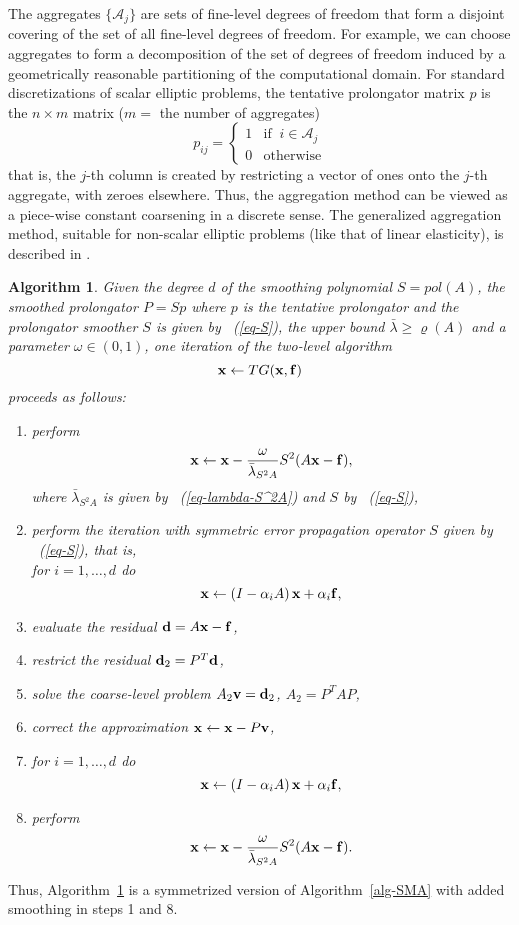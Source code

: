 \documentclass[twoside, 12pt]{article}
\newcommand{\vc}[1]{{\bf #1}} 			%
\newcommand{\eq}[1]{\begin{equation}\label{eq-#1}}
\newcommand{\qe}{\end{equation}}
\newcommand{\eqr}[1]{~(\ref{eq-#1})}        %
\newtheorem{algorithm}{Algorithm}
\begin{document}
The aggregates $\{\mathcal{A}_{j}\}$ are sets of fine-level degrees of freedom
that form a disjoint covering of the set of all fine-level degrees of freedom.
For example, we can choose aggregates to form a decomposition of the set of
degrees of freedom induced by a geometrically reasonable
partitioning of the computational domain.
For standard discretizations of scalar elliptic problems,
the tentative prolongator matrix $p$ is the $n\times m$ matrix
($m=$ the number of aggregates)
\eq{aggr-prol}
      p_{ij}=\left\{\begin{array}{ll}
                                  1 & \mbox{if}\;\; i \in \mathcal{A}_j \\
                                  0 & \mbox{otherwise}
                    \end{array} \right.
\qe
that is, the $j$-th column is created by restricting a vector of ones onto
the $j$-th aggregate, with zeroes elsewhere. Thus, the aggregation method
can be viewed as a piece-wise constant coarsening in a discrete sense.
The generalized aggregation
method, suitable for non-scalar elliptic problems
(like that of linear elasticity), is described in \cite{amg-theory}.

\begin{algorithm}
\label{alg-2L-final}
Given the degree $d$ of the smoothing polynomial $S=pol(A)$,
the smoothed prolongator $P=Sp$ where $p$ is the tentative prolongator and
the prolongator smoother $S$ is given by \eqr{S},
the upper bound
${\bar \lambda} \geq \varrho(A)$ and a parameter $\omega\in (0,1)$,
one iteration of the two-level
algorithm
$$
    \vc{x} \leftarrow TG(\vc{x},\vc{f})
$$
proceeds as follows:
\begin{enumerate}
\item perform
$$
         \vc{x} \leftarrow \vc{x} -
         \frac{\omega}{{\bar \lambda}_{S^2A}}S^2(A\vc{x}-\vc{f}),
$$
where $\bar{\lambda}_{S^2A}$ is given by \eqr{lambda-S^2A} and
$S$ by \eqr{S},
\item perform the iteration with symmetric error propagation operator $S$ 
given by \eqr{S}, that is, \\
for $i=1,\ldots,d$ do
$$
        \vc{x} \leftarrow \left(I-\alpha_i A\right)\vc{x} +
        \alpha_i \vc{f},
$$
\item evaluate the residual $\vc{d}=A\vc{x}-\vc{f}$,
\item restrict the residual $\vc{d}_2=P^T\vc{d}$,
\item solve the coarse-level problem $A_2\vc{v}=\vc{d}_2$, $A_2=P^TAP$,
\item correct the approximation $\vc{x} \leftarrow \vc{x}-P\vc{v}$,
\item for $i=1,\ldots,d$ do
$$
        \vc{x} \leftarrow \left(I-\alpha_i A\right)\vc{x} +
        \alpha_i \vc{f},
$$
\item perform
$$
         \vc{x} \leftarrow \vc{x} -
         \frac{\omega}{{\bar \lambda}_{S^2A}}S^2(A\vc{x}-\vc{f}).
$$
\end{enumerate}
\end{algorithm}
Thus, Algorithm~\ref{alg-2L-final} is a symmetrized version of
Algorithm~\ref{alg-SMA} with added smoothing in steps 1 and 8.
\end{document}
